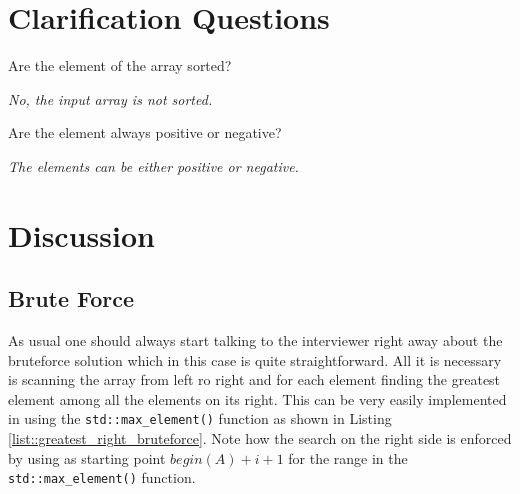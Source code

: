 \section{Clarification Questions}

\begin{QandA}
	\item \begin{questionitem} \begin{question} Are the element of the array sorted?  \end{question} 	 
    \begin{answered}
		\textit{No, the input array is not sorted.}
	\end{answered} \end{questionitem}
	
	\item \begin{questionitem} \begin{question} Are the element always positive or negative?  \end{question} 	 
    \begin{answered}
		\textit{The elements can be either positive or negative.}
	\end{answered} \end{questionitem}
	
\end{QandA}

\section{Discussion}

\subsection{Brute Force}
As usual one should always start talking to the interviewer right away about the bruteforce solution which in this case is quite straightforward. All it is necessary is scanning the array from left ro right and for each element finding the greatest element among all the elements on its right.
This can be very easily implemented in \CC using the \texttt{std::max\_element()} function as shown in Listing \ref{list::greatest_right_bruteforce}. Note how the search on the right side is enforced by using as starting point $begin(A)+i+1$ for the range in the \texttt{std::max\_element()} function.

	



